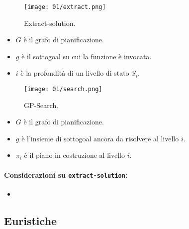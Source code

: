 \begin{figure}[h]
    \centering
    \texttt{[image: 01/extract.png]}
    \caption{Extract-solution.}
\end{figure}

\begin{itemize}
  \item $G$ è il grafo di pianificazione. 
  \item $g$ è il sottogoal su cui la funzione è invocata. 
  \item $i$ è la profondità di un livello di stato $S_i$. 
\end{itemize}

\begin{figure}[h]
    \centering
    \texttt{[image: 01/search.png]}
    \caption{GP-Search.}
\end{figure}

\begin{itemize}
  \item $G$ è il grafo di pianificazione. 
  \item $g$ è l'insieme di sottogoal ancora da risolvere al livello $i$. 
  \item $\pi_i$ è il piano in costruzione al livello $i$. 
\end{itemize}

\paragraph{Considerazioni su \texttt{extract-solution}:}

\begin{itemize}
  \item 
\end{itemize}

\subsection{Euristiche}






